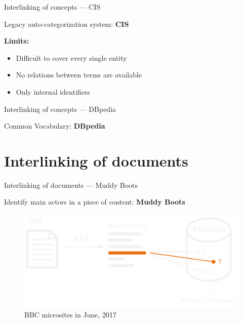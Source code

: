 \documentclass[10pt]{beamer}
\begin{document}
\begin{frame}[fragile]{Interlinking of concepts — CIS}

  Legacy auto-categorization system: {\textbf{CIS}}


  \bigskip
  \alert{\textbf{Limits:}}

  \begin{itemize}
    \item Difficult to cover every single entity
    \item No relations between terms are available
    \item Only internal identifiers
  \end{itemize}

\end{frame}

\begin{frame}[fragile]{Interlinking of concepts — DBpedia}

  Common Vocabulary: {\textbf{DBpedia}}


\end{frame}


\section{Interlinking of documents}

\begin{frame}[fragile]{Interlinking of documents — Muddy Boots}

  Identify main actors in a piece of content: {\textbf{Muddy Boots}}

  \begin{figure}
    \centering
      \includegraphics[width=.75\textwidth]{img/muddy_boots.png}
    \caption{BBC microsites in June, 2017}
  \end{figure}

\end{frame}
\end{document}
